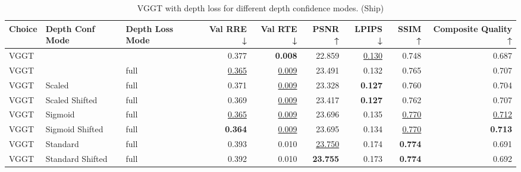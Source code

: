 \begin{table}[H]
\caption{\ifdefined\customcaption \customcaption \else VGGT with depth loss for different depth confidence modes. (Ship) \fi}
\label{tab:05_depth_conf_mode_ship}
\centering
\scriptsize
\begin{tabular}{lllrrrrrr}
\toprule
Choice & Depth Conf Mode & Depth Loss Mode & Val RRE ↓ & Val RTE ↓ & PSNR ↑ & LPIPS ↓ & SSIM ↑ & Composite Quality ↑ \\
\midrule
VGGT &  &  & 0.377 & \textbf{0.008} & 22.859 & \underline{0.130} & 0.748 & 0.687 \\
VGGT &  & full & \underline{0.365} & \underline{0.009} & 23.491 & 0.132 & 0.765 & 0.707 \\
VGGT & Scaled & full & 0.371 & \underline{0.009} & 23.328 & \textbf{0.127} & 0.760 & 0.704 \\
VGGT & Scaled Shifted & full & 0.369 & \underline{0.009} & 23.417 & \textbf{0.127} & 0.762 & 0.707 \\
VGGT & Sigmoid & full & \underline{0.365} & \underline{0.009} & 23.696 & 0.135 & \underline{0.770} & \underline{0.712} \\
VGGT & Sigmoid Shifted & full & \textbf{0.364} & \underline{0.009} & 23.695 & 0.134 & \underline{0.770} & \textbf{0.713} \\
VGGT & Standard & full & 0.393 & 0.010 & \underline{23.750} & 0.174 & \textbf{0.774} & 0.691 \\
VGGT & Standard Shifted & full & 0.392 & 0.010 & \textbf{23.755} & 0.173 & \textbf{0.774} & 0.692 \\
\bottomrule
\end{tabular}
\end{table}